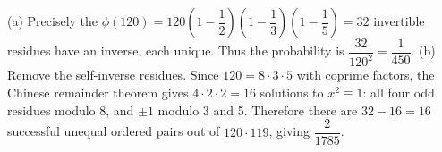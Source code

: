 (a) Precisely the $\phi(120)=120(1-\dfrac{1}{2})(1-\dfrac{1}{3})(1-\dfrac{1}{5})=32$ invertible residues have an inverse, each unique. Thus the probability is $\dfrac{32}{120^2}=\boxed{\dfrac{1}{450}}$. (b) Remove the self-inverse residues. Since $120=8\cdot3\cdot5$ with coprime factors, the Chinese remainder theorem gives $4\cdot2\cdot2=16$ solutions to $x^2\equiv1$: all four odd residues modulo 8, and $\pm1$ modulo 3 and 5. Therefore there are $32-16=16$ successful unequal ordered pairs out of $120\cdot119$, giving $\boxed{\dfrac{2}{1785}}$.
